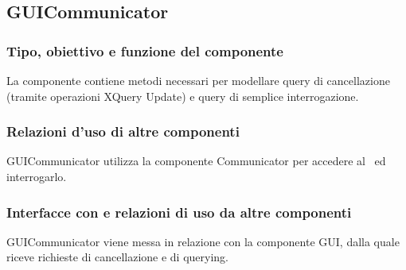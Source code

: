 \documentclass[11pt,titlepage,a4paper]{report}
\begin{document}
\subsection{GUICommunicator}
\subsubsection{Tipo, obiettivo e funzione del componente}
La componente contiene metodi necessari per modellare query di cancellazione (tramite operazioni XQuery Update) e query di semplice interrogazione.
\subsubsection{Relazioni d'uso di altre componenti}
GUICommunicator utilizza la componente Communicator per accedere al \re\ ed interrogarlo.
\subsubsection{Interfacce con e relazioni di uso da altre componenti}
GUICommunicator viene messa in relazione con la componente GUI, dalla quale riceve richieste di cancellazione e di querying.
\end{document}
